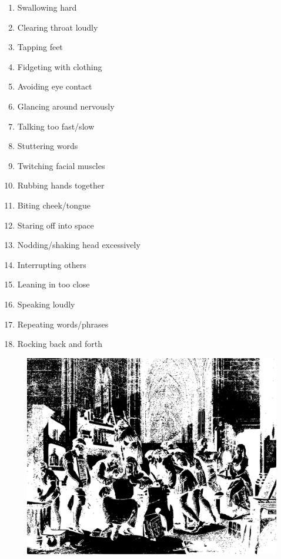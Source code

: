 \documentclass[12pt]{book}
\begin{document}
\begin{multicols}{2}
\begin{enumerate}
        \item Swallowing hard
        \item Clearing throat loudly
        \item Tapping feet
        \item Fidgeting with clothing
        \item Avoiding eye contact
        \item Glancing around nervously
        \item Talking too fast/slow
        \item Stuttering words
        \item Twitching facial muscles
        \item Rubbing hands together
        \item Biting cheek/tongue
        \item Staring off into space
        \item Nodding/shaking head excessively
        \item Interrupting others
        \item Leaning in too close
        \item Speaking loudly
        \item Repeating words/phrases
        \item Rocking back and forth
    \end{enumerate}
    \end{multicols}
    
\begin{figure}[h]
    \centering
    \includegraphics[width=\textwidth]{./images/personality06.pdf}
\end{figure}
\end{document}

